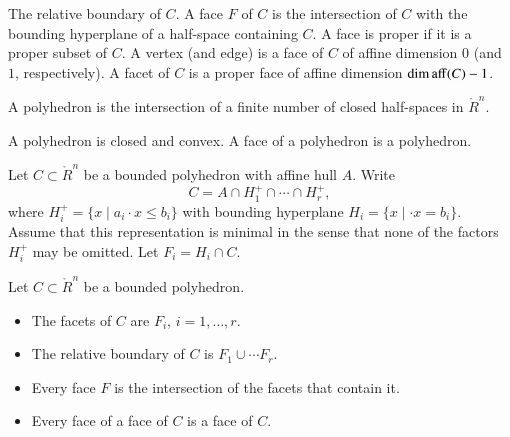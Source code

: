 \begin{definition}
The relative boundary of $C$.  A face $F$ of $C$ is the intersection of $C$ with the bounding hyperplane of a half-space containing $C$.  A face is proper if it is a proper subset of $C$.    A vertex (and edge) is a face of $C$ of affine dimension $0$ (and $1$, respectively).   A facet of $C$ is a proper face of affine dimension $\operatorname{dim\,aff}(C)-1$.
\end{definition}

%

\begin{definition}[polyhedron]  A polyhedron is the intersection of
a finite number of closed half-spaces in $\ring{R}^n$.
\end{definition}

A polyhedron is closed and convex.  A face of a polyhedron is a polyhedron. %

Let $C\subset\ring{R}^n$ be a bounded polyhedron with affine hull $A$. Write 
$$
C = A \cap H^+_1 \cap \cdots \cap H^+_r,
$$
where
$H^+_i = \{x\mid a_i\cdot x \le b_i\}$ with bounding hyperplane
$H_i=\{x\mid \cdot x = b_i\}$. Assume that this representation is minimal in the sense that none of the factors $H^+_i$ may be omitted.  Let $F_i = H_i\cap C$.


\begin{lemma}\label{lemma:webster}  
Let $C\subset\ring{R}^n$ be a bounded polyhedron.
\begin{itemize}
\item The facets of $C$ are $F_i$, $i=1,\ldots,r$.
\item The relative boundary of $C$ is $F_1\cup\cdots F_r$.
\item Every face $F$ is the intersection of the facets that contain it.
\item Every face of a face of $C$ is a face of $C$.
\end{itemize}
\end{lemma}

